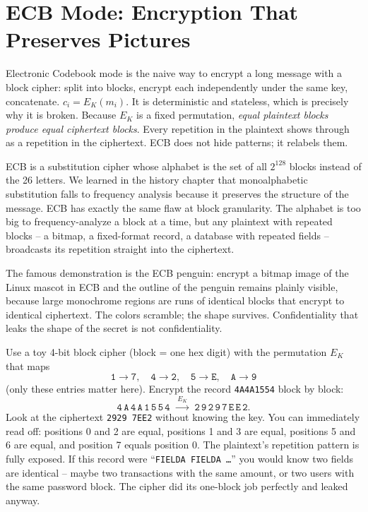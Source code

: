 \section{ECB Mode: Encryption That Preserves Pictures}
\label{ch38:ecb}

Electronic Codebook mode is the naive way to encrypt a long message with a block cipher: split into blocks, encrypt each independently under the same key, concatenate. $c_i = E_K(m_i)$. It is deterministic and stateless, which is precisely why it is broken. Because $E_K$ is a fixed permutation, \emph{equal plaintext blocks produce equal ciphertext blocks}. Every repetition in the plaintext shows through as a repetition in the ciphertext. ECB does not hide patterns; it relabels them.

\begin{intuitionbox}
ECB is a substitution cipher whose alphabet is the set of all $2^{128}$ blocks instead of the 26 letters. We learned in the history chapter that monoalphabetic substitution falls to frequency analysis because it preserves the structure of the message. ECB has exactly the same flaw at block granularity. The alphabet is too big to frequency-analyze a block at a time, but any plaintext with repeated blocks -- a bitmap, a fixed-format record, a database with repeated fields -- broadcasts its repetition straight into the ciphertext.
\end{intuitionbox}

The famous demonstration is the ECB penguin: encrypt a bitmap image of the Linux mascot in ECB and the outline of the penguin remains plainly visible, because large monochrome regions are runs of identical blocks that encrypt to identical ciphertext. The colors scramble; the shape survives. Confidentiality that leaks the shape of the secret is not confidentiality.

\begin{example}
\label{ch38:ex-ecb}
Use a toy 4-bit block cipher (block = one hex digit) with the permutation $E_K$ that maps
\[
\texttt{1}\!\to\!\texttt{7},\quad \texttt{4}\!\to\!\texttt{2},\quad \texttt{5}\!\to\!\texttt{E},\quad \texttt{A}\!\to\!\texttt{9}
\]
(only these entries matter here). Encrypt the record \texttt{4A4A1554} block by block:
\[
\texttt{4}\,\texttt{A}\,\texttt{4}\,\texttt{A}\,\texttt{1}\,\texttt{5}\,\texttt{5}\,\texttt{4}
\;\xrightarrow{\;E_K\;}\;
\texttt{2}\,\texttt{9}\,\texttt{2}\,\texttt{9}\,\texttt{7}\,\texttt{E}\,\texttt{E}\,\texttt{2}.
\]
Look at the ciphertext \texttt{2929 7EE2} without knowing the key. You can immediately read off: positions 0 and 2 are equal, positions 1 and 3 are equal, positions 5 and 6 are equal, and position 7 equals position 0. The plaintext's repetition pattern is fully exposed. If this record were ``\texttt{FIELDA FIELDA \dots}'' you would know two fields are identical -- maybe two transactions with the same amount, or two users with the same password block. The cipher did its one-block job perfectly and leaked anyway.
\end{example}

